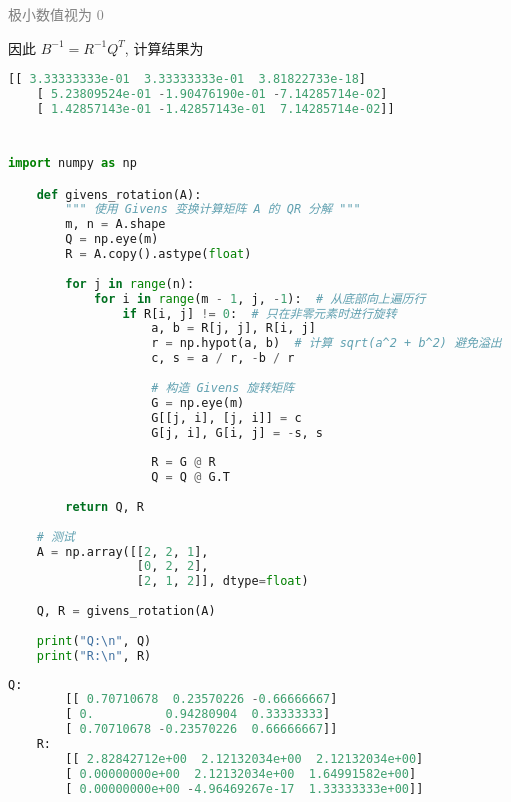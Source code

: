 \documentclass{article}
\begin{document}
\textcolor{gray}{极小数值视为 0}

因此 $B^{-1} = R^{-1}Q^T$, 计算结果为

\begin{lstlisting}[style=codestyle, language=Python,title=B 的逆]
    [[ 3.33333333e-01  3.33333333e-01  3.81822733e-18]
    [ 5.23809524e-01 -1.90476190e-01 -7.14285714e-02]
    [ 1.42857143e-01 -1.42857143e-01  7.14285714e-02]]
\end{lstlisting}

\section{}

\begin{lstlisting}[style=codestyle, language=Python,title=Givens 变换计算 QR 分解代码]
    import numpy as np

    def givens_rotation(A):
        """ 使用 Givens 变换计算矩阵 A 的 QR 分解 """
        m, n = A.shape
        Q = np.eye(m)
        R = A.copy().astype(float)
    
        for j in range(n):
            for i in range(m - 1, j, -1):  # 从底部向上遍历行
                if R[i, j] != 0:  # 只在非零元素时进行旋转
                    a, b = R[j, j], R[i, j]
                    r = np.hypot(a, b)  # 计算 sqrt(a^2 + b^2) 避免溢出
                    c, s = a / r, -b / r
                    
                    # 构造 Givens 旋转矩阵
                    G = np.eye(m)
                    G[[j, i], [j, i]] = c
                    G[j, i], G[i, j] = -s, s
    
                    R = G @ R
                    Q = Q @ G.T
    
        return Q, R
    
    # 测试
    A = np.array([[2, 2, 1],
                  [0, 2, 2],
                  [2, 1, 2]], dtype=float)
    
    Q, R = givens_rotation(A)
    
    print("Q:\n", Q)
    print("R:\n", R)    
\end{lstlisting}

\begin{lstlisting}[style=codestyle, language=Python,title=输出结果]
    Q:
        [[ 0.70710678  0.23570226 -0.66666667]
        [ 0.          0.94280904  0.33333333]
        [ 0.70710678 -0.23570226  0.66666667]]
    R:
        [[ 2.82842712e+00  2.12132034e+00  2.12132034e+00]
        [ 0.00000000e+00  2.12132034e+00  1.64991582e+00]
        [ 0.00000000e+00 -4.96469267e-17  1.33333333e+00]]
\end{lstlisting}
\end{document}
